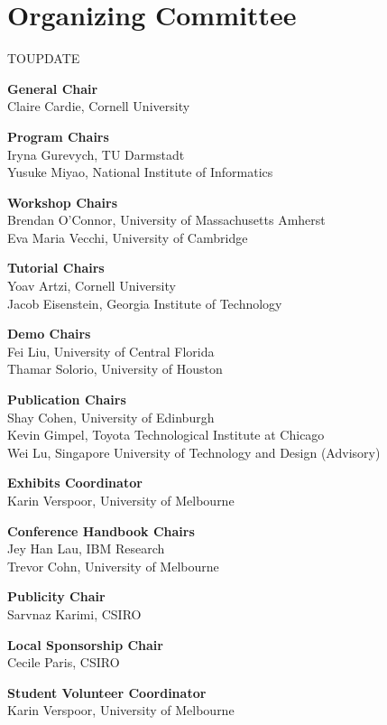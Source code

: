 \markboth{}{} %
\markright{}{} %

\section{Organizing Committee}{}

\setlength{\parindent}{0pt}

TOUPDATE %

{\bf General Chair} \\
Claire Cardie, Cornell University

{\bf Program Chairs} \\
Iryna Gurevych, TU Darmstadt\\
Yusuke Miyao, National Institute of Informatics

{\bf Workshop Chairs} \\
Brendan O’Connor, University of Massachusetts Amherst\\
Eva Maria Vecchi, University of Cambridge

{\bf Tutorial Chairs} \\
Yoav Artzi, Cornell University\\
Jacob Eisenstein, Georgia Institute of Technology

{\bf Demo Chairs} \\
Fei Liu, University of Central Florida\\
Thamar Solorio, University of Houston

{\bf Publication Chairs} \\
Shay Cohen, University of Edinburgh\\
Kevin Gimpel, Toyota Technological Institute at Chicago\\
Wei Lu, Singapore University of Technology and Design (Advisory)

{\bf Exhibits Coordinator} \\
Karin Verspoor, University of Melbourne

{\bf Conference Handbook Chairs} \\
Jey Han Lau, IBM Research\\
Trevor Cohn, University of Melbourne

{\bf Publicity Chair} \\
Sarvnaz Karimi, CSIRO

{\bf Local Sponsorship Chair} \\
Cecile Paris, CSIRO

{\bf Student Volunteer Coordinator} \\
Karin Verspoor, University of Melbourne

